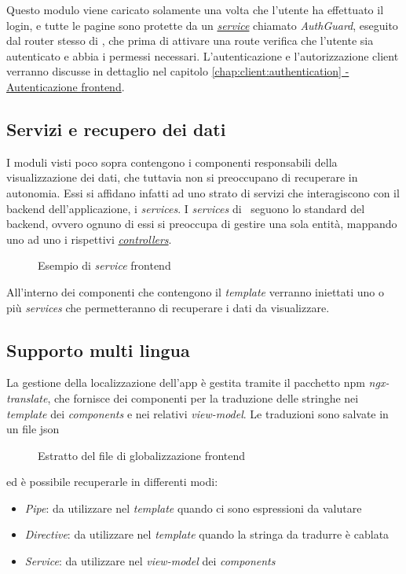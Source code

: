 \noindent
Questo modulo viene caricato solamente una volta che l'utente ha effettuato il login, e tutte le pagine sono protette da un \hyperref[chap:client:services]{\textit{service}} chiamato \textit{AuthGuard}, eseguito dal router stesso di \angular, che prima di attivare una route verifica che l'utente sia autenticato e abbia i permessi necessari. L'autenticazione e l'autorizzazione client verranno discusse in dettaglio nel capitolo \hyperref[chap:client:authentication]{\ref{chap:client:authentication} - Autenticazione \gls{frontend}}.

\subsection{Servizi e recupero dei dati}
\label{client:services}
I moduli visti poco sopra contengono i componenti responsabili della visualizzazione dei dati, che tuttavia non si preoccupano di recuperare in autonomia. Essi si affidano infatti ad uno strato di servizi che interagiscono con il \gls{backend} dell'applicazione, i \textit{services}.
I \textit{services} di \angular~seguono lo standard del \gls{backend}, ovvero ognuno di essi si preoccupa di gestire una sola entità, mappando uno ad uno i rispettivi \hyperref[server:controllers]{\textit{controllers}}.
 \begin{figure}[!h] 
 	\centering    
 	
 	\caption[Esempio di \textit{service} \gls{frontend}]{Esempio di \textit{service} \gls{frontend}}
 	\label{fig:client-service}
 \end{figure}
All'interno dei componenti che contengono il \textit{template} verranno iniettati uno o più \textit{services} che permetteranno di recuperare i dati da visualizzare.

 \subsection{Supporto multi lingua}
 La gestione della localizzazione dell'app è gestita tramite il pacchetto \acrshort{npm} \textit{ngx-translate}, che fornisce dei componenti per la traduzione delle stringhe nei \textit{template} dei \textit{components} e nei relativi \textit{view-model}. Le traduzioni sono salvate in un file \acrshort{json}
 \begin{figure}[H] 
	\centering    
	
	\caption[Estratto del file di globalizzazione \gls{frontend}]{Estratto del file di globalizzazione \gls{frontend}}
	\label{fig:client-globalization}
\end{figure}
\noindent
ed è possibile recuperarle in differenti modi:
\begin{itemize}
	\item \textit{Pipe}: da utilizzare nel \textit{template} quando ci sono espressioni da valutare
	\item \textit{Directive}: da utilizzare nel \textit{template} quando la stringa da tradurre è cablata
	\item \textit{Service}: da utilizzare nel \textit{view-model} dei \textit{components}
\end{itemize}

